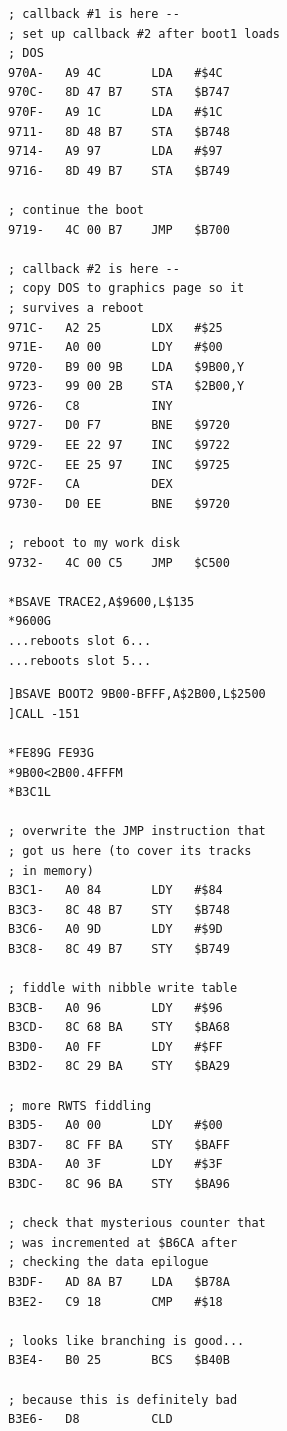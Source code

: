 \documentclass{article}
\begin{document}
\begin{verbatim}
; callback #1 is here --
; set up callback #2 after boot1 loads
; DOS
970A-   A9 4C       LDA   #$4C
970C-   8D 47 B7    STA   $B747
970F-   A9 1C       LDA   #$1C
9711-   8D 48 B7    STA   $B748
9714-   A9 97       LDA   #$97
9716-   8D 49 B7    STA   $B749

; continue the boot
9719-   4C 00 B7    JMP   $B700

; callback #2 is here --
; copy DOS to graphics page so it
; survives a reboot
971C-   A2 25       LDX   #$25
971E-   A0 00       LDY   #$00
9720-   B9 00 9B    LDA   $9B00,Y
9723-   99 00 2B    STA   $2B00,Y
9726-   C8          INY
9727-   D0 F7       BNE   $9720
9729-   EE 22 97    INC   $9722
972C-   EE 25 97    INC   $9725
972F-   CA          DEX
9730-   D0 EE       BNE   $9720

; reboot to my work disk
9732-   4C 00 C5    JMP   $C500

*BSAVE TRACE2,A$9600,L$135
*9600G
...reboots slot 6...
...reboots slot 5...
\end{verbatim}

\newpage

\begin{verbatim}
]BSAVE BOOT2 9B00-BFFF,A$2B00,L$2500
]CALL -151

*FE89G FE93G
*9B00<2B00.4FFFM
*B3C1L

; overwrite the JMP instruction that
; got us here (to cover its tracks
; in memory)
B3C1-   A0 84       LDY   #$84
B3C3-   8C 48 B7    STY   $B748
B3C6-   A0 9D       LDY   #$9D
B3C8-   8C 49 B7    STY   $B749

; fiddle with nibble write table
B3CB-   A0 96       LDY   #$96
B3CD-   8C 68 BA    STY   $BA68
B3D0-   A0 FF       LDY   #$FF
B3D2-   8C 29 BA    STY   $BA29

; more RWTS fiddling
B3D5-   A0 00       LDY   #$00
B3D7-   8C FF BA    STY   $BAFF
B3DA-   A0 3F       LDY   #$3F
B3DC-   8C 96 BA    STY   $BA96

; check that mysterious counter that
; was incremented at $B6CA after
; checking the data epilogue
B3DF-   AD 8A B7    LDA   $B78A
B3E2-   C9 18       CMP   #$18

; looks like branching is good...
B3E4-   B0 25       BCS   $B40B

; because this is definitely bad
B3E6-   D8          CLD
\end{verbatim}

\newpage
\end{document}
